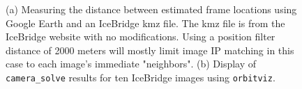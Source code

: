 \begin{figure}[h!]
\centering
  \hfil
\caption{(a) Measuring the distance between estimated frame locations using Google Earth
and an IceBridge kmz file.  The kmz file is from the IceBridge website with no modifications.
Using a position filter distance of 2000 meters will mostly limit image IP matching
in this case to each image's immediate "neighbors".  (b) Display of \texttt{camera\_solve}
results for ten IceBridge images using \texttt{orbitviz}.}
\label{fig:pinhole-icebridge-camera-results}
\end{figure}



